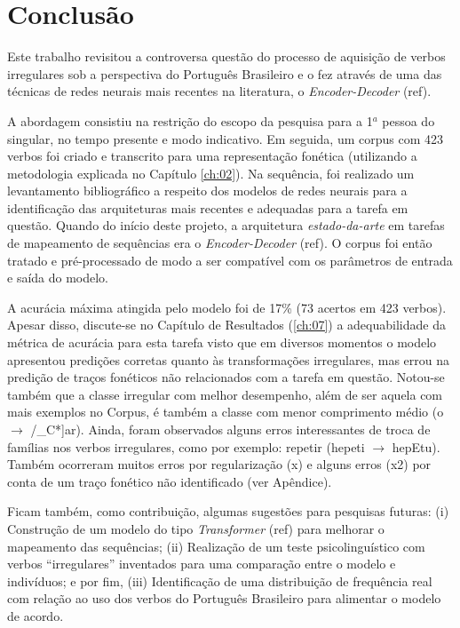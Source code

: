 \chapter{Conclusão}
\label{ch:08}

Este trabalho revisitou a controversa questão do processo de aquisição de verbos irregulares sob a perspectiva do Português Brasileiro e o fez através de uma das técnicas de redes neurais mais recentes na literatura, o \textit{Encoder-Decoder} (ref). 

A abordagem consistiu na restrição do escopo da pesquisa para a 1$^{a}$ pessoa do singular, no tempo presente e modo indicativo. Em seguida, um corpus com 423 verbos foi criado e transcrito para uma representação fonética (utilizando a metodologia explicada no Capítulo \ref{ch:02}). Na sequência, foi realizado um levantamento bibliográfico a respeito dos modelos de redes neurais para a identificação das arquiteturas mais recentes e adequadas para a tarefa em questão. Quando do início deste projeto, a arquitetura \textit{estado-da-arte} em tarefas de mapeamento de sequências era o \textit{Encoder-Decoder} (ref). O corpus foi então tratado e pré-processado de modo a ser compatível com os parâmetros de entrada e saída do modelo. 

A acurácia máxima atingida pelo modelo foi de 17\% (73 acertos em 423 verbos). Apesar disso, discute-se no Capítulo de Resultados (\ref{ch:07}) a adequabilidade da métrica de acurácia para esta tarefa visto que em diversos momentos o modelo apresentou predições corretas quanto às transformações irregulares, mas errou na predição de traços fonéticos não relacionados com a tarefa em questão. Notou-se também que a classe irregular com melhor desempenho, além de ser aquela com mais exemplos no Corpus, é também a classe com menor comprimento médio (o $\rightarrow$ \textopeno/\_C*]ar). Ainda, foram observados alguns erros interessantes de troca de famílias nos verbos irregulares, como por exemplo: repetir (hepeti $\rightarrow$ hepEtu). Também ocorreram muitos erros por regularização (x) e alguns erros (x2) por conta de um traço fonético não identificado (ver Apêndice). 

Ficam também, como contribuição, algumas sugestões para pesquisas futuras: (i) Construção de um modelo do tipo \textit{Transformer} (ref) para melhorar o mapeamento das sequências; (ii) Realização de um teste psicolinguístico com verbos “irregulares” inventados para uma comparação entre o modelo e indivíduos; e por fim, (iii) Identificação de uma distribuição de frequência real com relação ao uso dos verbos do Português Brasileiro para alimentar o modelo de acordo. 

